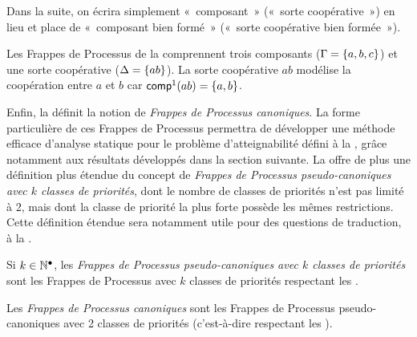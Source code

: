 Dans la suite, on écrira simplement «~composant~» (\resp «~sorte coopérative~»)
en lieu et place de «~composant bien formé~» (\resp «~sorte coopérative bien formée~»).

\begin{example}
  Les Frappes de Processus de la  comprennent
  trois composants ($\Gamma = \{ a, b, c \}$)
  et une sorte coopérative ($\Delta = \{ ab \}$).
  La sorte coopérative $ab$ modélise la coopération entre $a$ et $b$ car
  $\mathsf{comp}^1(ab) = \{ a, b \}$.
\end{example}

Enfin, la  définit la notion de \emph{Frappes de Processus canoniques}.
La forme particulière de ces Frappes de Processus permettra de développer une méthode efficace
d'analyse statique pour le problème d'atteignabilité défini à la ,
grâce notamment aux résultats développés dans la section suivante.
La  offre de plus une définition plus étendue du concept
de \emph{Frappes de Processus pseudo-canoniques avec $k$ classes de priorités},
dont le nombre de classes de priorités n'est pas limité à 2,
mais dont la classe de priorité la plus forte possède les mêmes restrictions.
Cette définition étendue sera notamment utile pour des questions de traduction,
à la .

\begin{definition}
  Si $k \in \mathbb{N}^\bullet$, les \emph{Frappes de Processus pseudo-canoniques avec $k$ classes de priorités}
  sont les Frappes de Processus avec $k$ classes de priorités
  respectant les \allcr.
\end{definition}

\begin{definition}
  Les \emph{Frappes de Processus canoniques}
  sont les Frappes de Processus pseudo-canoniques avec 2 classes de priorités
  (c'est-à-dire respectant les \allcr).
\end{definition}



